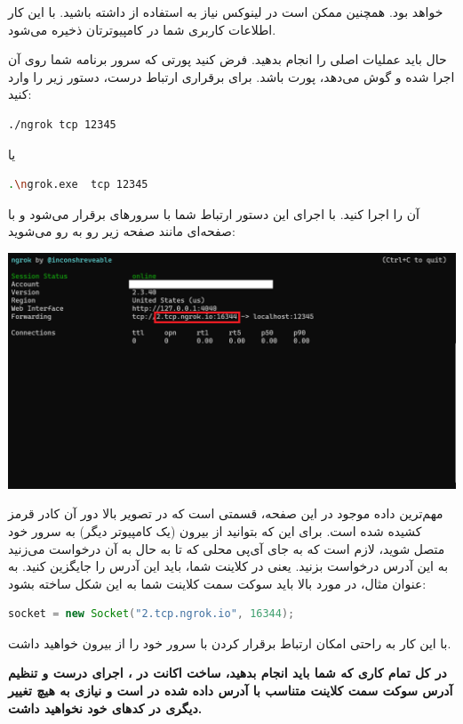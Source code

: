 \documentclass[]{article}
\begin{document}
خواهد بود. همچنین ممکن است در لینوکس نیاز به استفاده از   داشته باشید. با این کار اطلاعات کاربری شما در کامپیوترتان ذخیره می‌شود.


حال باید عملیات اصلی را انجام بدهید. فرض کنید پورتی که سرور برنامه شما روی آن اجرا شده و گوش می‌دهد، پورت  باشد. برای برقراری ارتباط درست، دستور زیر را وارد کنید:

\begin{latin}
\begin{lstlisting}[language = bash]
./ngrok tcp 12345
\end{lstlisting}
\end{latin}

یا

\begin{latin}
\begin{lstlisting}[language = bash]
.\ngrok.exe  tcp 12345
\end{lstlisting}
\end{latin}

آن را اجرا کنید. با اجرای این دستور ارتباط شما با سرورهای  برقرار می‌شود و با صفحه‌ای مانند صفحه زیر رو به رو می‌شوید:

 \begin{center}
	\includegraphics[width = 1.0 \textwidth]{images/2.png}
\end{center}

مهم‌ترین داده موجود در این صفحه، قسمتی است که در تصویر بالا دور آن کادر قرمز کشیده‌ شده است. برای این که بتوانید از بیرون (یک کامپیوتر دیگر) به سرور خود متصل شوید، لازم است که به جای آی‌پی محلی   که تا به حال به آن درخواست می‌زنید به این آدرس درخواست بزنید. یعنی در کلاینت شما، باید این آدرس را جایگزین کنید. به عنوان مثال، در مورد بالا باید سوکت سمت کلاینت شما به این شکل ساخته بشود:


\begin{latin}
\begin{lstlisting}[language = java]
socket = new Socket("2.tcp.ngrok.io", 16344);
\end{lstlisting}
\end{latin}

با این کار به راحتی امکان ارتباط برقرار کردن با سرور خود را از بیرون خواهید داشت.


\textbf{
	در کل تمام کاری که شما باید انجام بدهید، ساخت اکانت در ، اجرای درست  و تنظیم آدرس سوکت سمت کلاینت متناسب با آدرس داده شده در  است و نیازی به هیچ تغییر دیگری در کدهای خود نخواهید داشت.}
\end{document}
